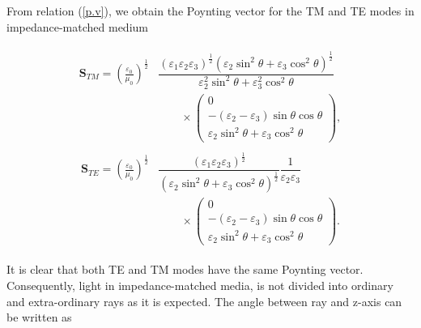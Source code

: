 \documentclass[9pt,twocolumn,twoside]{osajnl}
\begin{document}
From relation (\ref{p.v}), we obtain the Poynting vector for the TM and TE modes in impedance-matched medium

\begin{align}\label{s}
\begin{split}
  \mathbf{S}_{TM}=\left(\frac{\varepsilon_{0}}{\mu_{0}}\right)^{\frac{1}{2}}&\dfrac{(\varepsilon_{1}\varepsilon_{2}\varepsilon_{3})^{\frac{1}{2}}({\varepsilon_{2}\sin^{2}{\theta}+\varepsilon_{3}\cos^{2}{\theta}})^{\frac{1}{2}}}{\varepsilon_{2}^{2} \sin^{2}{\theta} + \varepsilon_{3}^{2}\cos^{2}{\theta}}
\\& \qquad\times
 \begin{pmatrix}
 0\\ -(\varepsilon_{2}-\varepsilon_{3})\sin{\theta}\cos{\theta}  \\  \varepsilon_{2} \sin^{2}{\theta} + \varepsilon_{3}\cos^{2}{\theta}
 \end{pmatrix},
 \end{split}
 \end{align}
\begin{align}\label{p.v 2}
\begin{split}
\mathbf{S}_{TE}=\left(\frac{\varepsilon_{0}}{\mu_{0}}\right)^{\frac{1}{2}}&\dfrac{(\varepsilon_{1}\varepsilon_{2}\varepsilon_{3})^{\frac{1}{2}}}{({\varepsilon_{2}\sin^{2}{\theta}+\varepsilon_{3}\cos^{2}{\theta}})^{\frac{1}{2}}}\dfrac{1}{\varepsilon_{2}\varepsilon_{3}}
\\ &\qquad\times
\begin{pmatrix}
 0 \\ -(\varepsilon_{2}-\varepsilon_{3})\sin\theta\cos\theta \\   \varepsilon_{2} \sin^{2}\theta + \varepsilon_{3}\cos^{2}\theta
 \end{pmatrix}.
 \end{split}
\end{align}

It is clear that both TE and TM modes have the same Poynting vector. Consequently, light in impedance-matched media, is not divided into ordinary and extra-ordinary rays as it is expected.
The angle between ray and z-axis can be written as
\end{document}
